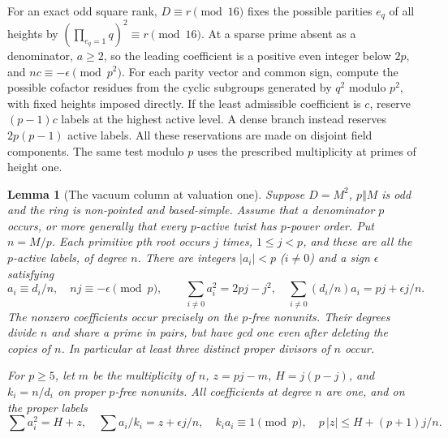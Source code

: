 \documentclass[11pt]{amsart}
\numberwithin{equation}{section}
\newtheorem{lemma}[theorem]{Lemma}
\theoremstyle{definition}
\theoremstyle{plain}
\begin{document}
For an exact odd square rank, $D\equiv r\pmod{16}$ fixes the possible
parities $e_q$ of all heights by
$(\prod_{e_q=1} q)^2\equiv r\pmod{16}$. At a sparse prime absent as
a denominator, $a\ge2$, so the leading coefficient is a positive
even integer below $2p$, and $nc\equiv-\epsilon\pmod{p^2}$.
For each parity vector and common sign, compute the possible
cofactor residues from the cyclic subgroups generated by $q^2$
modulo $p^2$, with fixed heights imposed directly. If the least
admissible coefficient is $c$, reserve $(p-1)c$ labels at the
highest active level. A dense branch instead reserves $2p(p-1)$
active labels. All these reservations are made on disjoint field
components. The same test modulo $p$ uses the prescribed multiplicity
at primes of height one. 

\begin{lemma}[The vacuum column at valuation one]\label{new:weyl}
Suppose $D=M^2$, $p\Vert M$ is odd and the ring is non-pointed and
based-simple. Assume that a denominator $p$ occurs, or more generally
that every $p$-active twist has $p$-power order. Put $n=M/p$.
Each primitive $p$th root occurs $j$ times, $1\le j<p$, and these
are all the $p$-active labels, of degree $n$. There are integers
$|a_i|<p$ ($i\ne0$) and a sign $\epsilon$ satisfying
\begin{equation}\label{new:local-column-sums}
 a_i\equiv d_i/n,\quad nj\equiv-\epsilon\pmod p,\qquad
 \sum_{i\ne0}a_i^2=2pj-j^2,\quad
 \sum_{i\ne0}(d_i/n)a_i=pj+\epsilon j/n .
\end{equation}
The nonzero coefficients occur precisely on the $p$-free nonunits.
Their degrees divide $n$ and share a prime in pairs, but have gcd one
even after deleting the copies of $n$. In particular at least three
distinct proper divisors of $n$ occur.

For $p\ge5$, let $m$ be the multiplicity of $n$, $z=pj-m$,
$H=j(p-j)$, and $k_i=n/d_i$ on proper $p$-free nonunits. All
coefficients at degree $n$ are one, and on the proper labels
\begin{equation}\label{eq:weyl-cost}
 \sum a_i^2=H+z,\quad \sum a_i/k_i=z+\epsilon j/n,\quad
 k_i a_i\equiv1\pmod p,\quad p\,|z|\le H+(p+1)j/n .
\end{equation}
\end{lemma}
\end{document}
